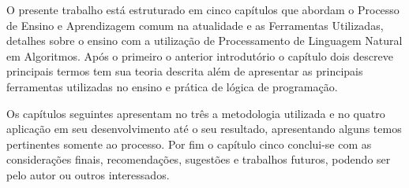 O presente trabalho está estruturado em cinco capítulos que abordam o Processo de Ensino e Aprendizagem comum na atualidade e as Ferramentas Utilizadas, detalhes sobre o ensino com a utilização de Processamento de Linguagem Natural em Algoritmos. Após o primeiro o anterior introdutório o capítulo dois descreve principais termos tem sua teoria descrita além de apresentar as principais ferramentas utilizadas no ensino e prática de lógica de programação.

Os capítulos seguintes apresentam no três a metodologia utilizada e no quatro aplicação em seu desenvolvimento até o seu resultado, apresentando alguns temos pertinentes somente ao processo. Por fim o capítulo cinco conclui-se com as considerações finais, recomendações, sugestões e trabalhos futuros, podendo ser pelo autor ou outros interessados.
